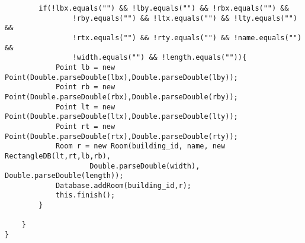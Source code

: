 \begin{lstlisting}
        if(!lbx.equals("") && !lby.equals("") && !rbx.equals("") &&
                !rby.equals("") && !ltx.equals("") && !lty.equals("") &&
                !rtx.equals("") && !rty.equals("") && !name.equals("") &&
                !width.equals("") && !length.equals("")){
            Point lb = new Point(Double.parseDouble(lbx),Double.parseDouble(lby));
            Point rb = new Point(Double.parseDouble(rbx),Double.parseDouble(rby));
            Point lt = new Point(Double.parseDouble(ltx),Double.parseDouble(lty));
            Point rt = new Point(Double.parseDouble(rtx),Double.parseDouble(rty));
            Room r = new Room(building_id, name, new RectangleDB(lt,rt,lb,rb),
                    Double.parseDouble(width), Double.parseDouble(length));
            Database.addRoom(building_id,r);
            this.finish();
        }

    }
}
\end{lstlisting}
\newpage
